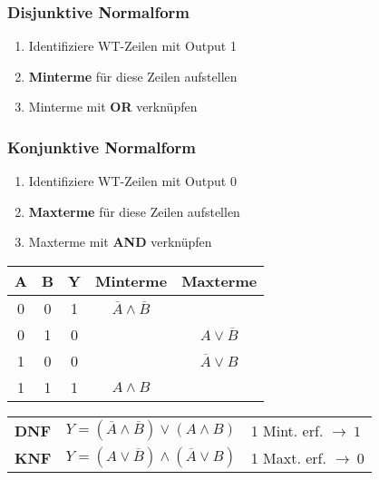 \subsubsection{Disjunktive Normalform}
\begin{enumerate}
    \item Identifiziere WT-Zeilen mit Output 1
    \item \textbf{Minterme} für diese Zeilen aufstellen
    \item Minterme mit \textbf{OR} verknüpfen
\end{enumerate}
\subsubsection{Konjunktive Normalform}
\begin{enumerate}
    \item Identifiziere WT-Zeilen mit Output 0
    \item \textbf{Maxterme} für diese Zeilen aufstellen
    \item Maxterme mit \textbf{AND} verknüpfen
\end{enumerate}
\begin{center}
        \begin{tabular}{|c c|c|c|c|}
            \hline
            A & B & Y & Minterme & Maxterme\\
            \hline
            0 & 0 & 1 & $\overline{A} \land \overline{B}$ & \\
            0 & 1 & 0 & & $A \lor \overline{B}$\\
            1 & 0 & 0 & & $\overline{A} \lor B$\\
            1 & 1 & 1 & $A \land B$ & \\
            \hline
        \end{tabular}
\end{center}

\begin{flushleft}
    \renewcommand{\arraystretch}{1.5}
    \begin{tabular}{l l l}
        \textbf{DNF} & $Y = (\overline{A} \land \overline{B}) \lor (A \land B)$ & {\small 1 Mint. erf. $\rightarrow~1$}\\
        \textbf{KNF} & $Y = (A \lor \overline{B}) \land (\overline{A} \lor B)$ & {\small 1 Maxt. erf. $\rightarrow~0$}\\
    \end{tabular}
\end{flushleft}